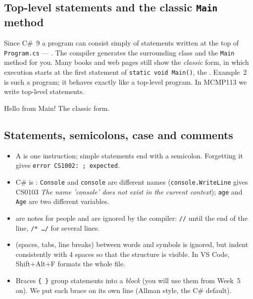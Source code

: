 \subsection{Top-level statements and the classic \texttt{Main} method}
Since C\#~9 a program can consist simply of statements written at the top of \texttt{Program.cs} --- . The compiler generates the surrounding class and the \texttt{Main} method for you. Many books and web pages still show the \emph{classic} form, in which execution starts at the first statement of \texttt{static void Main()}, the . Example~2 is such a program; it behaves exactly like a top-level program. In MCMP113 we write top-level statements.

\begin{consolebox}[Output]
\begin{run}
Hello from Main!
The classic form.
\end{run}
\end{consolebox}

\subsection{Statements, semicolons, case and comments}
\begin{itemize}[leftmargin=*,itemsep=2pt]
  \item A  is one instruction; simple statements end with a semicolon. Forgetting it gives \texttt{error CS1002: ; expected}.
  \item C\# is : \texttt{Console} and \texttt{console} are different names (\texttt{console.WriteLine} gives CS0103 \emph{The name 'console' does not exist in the current context}); \texttt{age} and \texttt{Age} are two different variables.
  \item {} are notes for people and are ignored by the compiler: \texttt{//} until the end of the line, \texttt{/* \dots */} for several lines.
  \item {} (spaces, tabs, line breaks) between words and symbols is ignored, but indent consistently with 4 spaces so that the structure is visible. In VS Code, Shift+Alt+F formats the whole file.
  \item Braces \texttt{\{ \}} group statements into a \emph{block} (you will use them from Week~5 on). We put each brace on its own line (Allman style, the C\# default).
\end{itemize}

